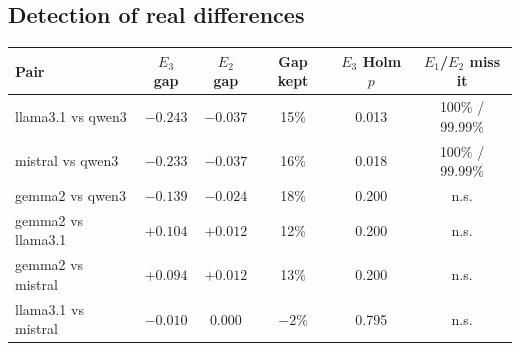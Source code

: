 \documentclass[11pt,a4paper]{article}
\newcommand{\E}[1]{E_{#1}}
\begin{document}
\subsection{Detection of real differences}
\begin{center}\small
\begin{tabular}{@{}lccccc@{}}
\toprule
Pair & $\E3$ gap & $\E2$ gap & Gap kept & $\E3$ Holm $p$ & $\E1$/$\E2$ miss it\\
\midrule
llama3.1 vs qwen3 & $-0.243$ & $-0.037$ & 15\% & 0.013 & 100\% / 99.99\%\\
mistral vs qwen3 & $-0.233$ & $-0.037$ & 16\% & 0.018 & 100\% / 99.99\%\\
gemma2 vs qwen3 & $-0.139$ & $-0.024$ & 18\% & 0.200 & n.s.\\
gemma2 vs llama3.1 & $+0.104$ & $+0.012$ & 12\% & 0.200 & n.s.\\
gemma2 vs mistral & $+0.094$ & $+0.012$ & 13\% & 0.200 & n.s.\\
llama3.1 vs mistral & $-0.010$ & $0.000$ & $-2$\% & 0.795 & n.s.\\
\bottomrule
\end{tabular}
\end{center}
\end{document}
